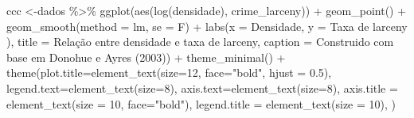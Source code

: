 \documentclass[
]{article}
\newenvironment{Shaded}{\begin{snugshade}}{\end{snugshade}}
\newcommand{\AttributeTok}[1]{\textcolor[rgb]{0.77,0.63,0.00}{#1}}
\newcommand{\DecValTok}[1]{\textcolor[rgb]{0.00,0.00,0.81}{#1}}
\newcommand{\FloatTok}[1]{\textcolor[rgb]{0.00,0.00,0.81}{#1}}
\newcommand{\FunctionTok}[1]{\textcolor[rgb]{0.00,0.00,0.00}{#1}}
\newcommand{\NormalTok}[1]{#1}
\newcommand{\OtherTok}[1]{\textcolor[rgb]{0.56,0.35,0.01}{#1}}
\newcommand{\SpecialCharTok}[1]{\textcolor[rgb]{0.00,0.00,0.00}{#1}}
\newcommand{\StringTok}[1]{\textcolor[rgb]{0.31,0.60,0.02}{#1}}
\begin{document}
\begin{Shaded}
\begin{Highlighting}[]
\NormalTok{ccc }\OtherTok{\textless{}{-}}\NormalTok{dados }\SpecialCharTok{\%\textgreater{}\%} 
  \FunctionTok{ggplot}\NormalTok{(}\FunctionTok{aes}\NormalTok{(}\FunctionTok{log}\NormalTok{(densidade), crime\_larceny)) }\SpecialCharTok{+}
  \FunctionTok{geom\_point}\NormalTok{() }\SpecialCharTok{+} 
  \FunctionTok{geom\_smooth}\NormalTok{(}\AttributeTok{method =} \StringTok{\textquotesingle{}lm\textquotesingle{}}\NormalTok{, }\AttributeTok{se =}\NormalTok{ F) }\SpecialCharTok{+}
  \FunctionTok{labs}\NormalTok{(}\AttributeTok{x =} \StringTok{\textquotesingle{}Densidade\textquotesingle{}}\NormalTok{,}
       \AttributeTok{y =} \StringTok{\textquotesingle{}Taxa de larceny )\textquotesingle{}}\NormalTok{,}
       \AttributeTok{title =} \StringTok{\textquotesingle{}Relação entre densidade e taxa de larceny\textquotesingle{}}\NormalTok{,}
       \AttributeTok{caption =} \StringTok{\textquotesingle{}Construido com base em Donohue e Ayres (2003)\textquotesingle{}}\NormalTok{) }\SpecialCharTok{+} 
  \FunctionTok{theme\_minimal}\NormalTok{() }\SpecialCharTok{+}
  \FunctionTok{theme}\NormalTok{(}\AttributeTok{plot.title=}\FunctionTok{element\_text}\NormalTok{(}\AttributeTok{size=}\DecValTok{12}\NormalTok{, }\AttributeTok{face=}\StringTok{"bold"}\NormalTok{, }\AttributeTok{hjust =} \FloatTok{0.5}\NormalTok{),}
        \AttributeTok{legend.text=}\FunctionTok{element\_text}\NormalTok{(}\AttributeTok{size=}\DecValTok{8}\NormalTok{),}
        \AttributeTok{axis.text=}\FunctionTok{element\_text}\NormalTok{(}\AttributeTok{size=}\DecValTok{8}\NormalTok{),}
        \AttributeTok{axis.title =} \FunctionTok{element\_text}\NormalTok{(}\AttributeTok{size =} \DecValTok{10}\NormalTok{, }\AttributeTok{face=}\StringTok{"bold"}\NormalTok{),}
        \AttributeTok{legend.title =} \FunctionTok{element\_text}\NormalTok{(}\AttributeTok{size =} \DecValTok{10}\NormalTok{),}
\NormalTok{  )}



\end{Highlighting}
\end{Shaded}
\end{document}
